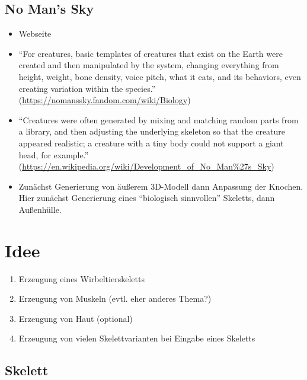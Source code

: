\section{No Man's Sky}

\begin{itemize}
 \item Webseite \cite{NoMansSky}
 \item "`For creatures, basic templates of creatures that exist on the Earth were created and then manipulated by the system, changing everything from height, weight, bone density, voice pitch, what it eats, and its behaviors, even creating variation within the species."' (\url{https://nomanssky.fandom.com/wiki/Biology})
 \item "`Creatures were often generated by mixing and matching random parts from a library, and then adjusting the underlying skeleton so that the creature appeared realistic; a creature with a tiny body could not support a giant head, for example."' (\url{https://en.wikipedia.org/wiki/Development_of_No_Man\%27s_Sky})
 \item Zunächst Generierung von äußerem 3D-Modell dann Anpassung der Knochen. Hier zunächst Generierung eines "`biologisch sinnvollen"' Skeletts, dann Außenhülle.
\end{itemize}


\chapter{Idee}

\begin{enumerate}
 \item Erzeugung eines Wirbeltierskeletts
 \item Erzeugung von Muskeln (evtl. eher anderes Thema?)
 \item Erzeugung von Haut (optional)
 \item Erzeugung von vielen Skelettvarianten bei Eingabe eines Skeletts
\end{enumerate}

\section{Skelett}

